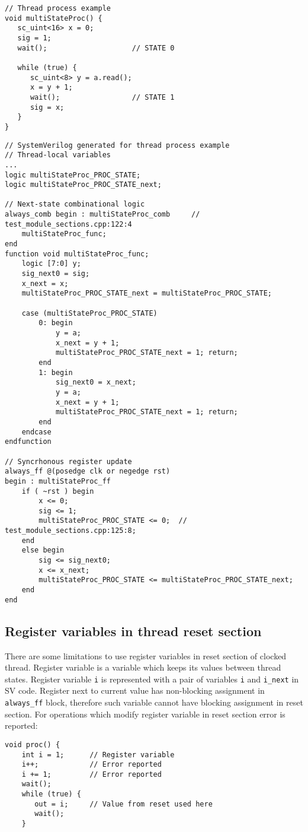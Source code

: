 \begin{lstlisting}[style=mycpp]
// Thread process example
void multiStateProc() {
   sc_uint<16> x = 0;
   sig = 1;              
   wait();                    // STATE 0

   while (true) {
      sc_uint<8> y = a.read(); 
      x = y + 1;
      wait();                 // STATE 1
      sig = x;           
   }
}
\end{lstlisting}

\begin{lstlisting}[style=myverilog]
// SystemVerilog generated for thread process example
// Thread-local variables
...
logic multiStateProc_PROC_STATE;
logic multiStateProc_PROC_STATE_next;

// Next-state combinational logic
always_comb begin : multiStateProc_comb     // test_module_sections.cpp:122:4
    multiStateProc_func;
end
function void multiStateProc_func;
    logic [7:0] y;
    sig_next0 = sig;
    x_next = x;
    multiStateProc_PROC_STATE_next = multiStateProc_PROC_STATE;
    
    case (multiStateProc_PROC_STATE)
        0: begin
            y = a;
            x_next = y + 1;
            multiStateProc_PROC_STATE_next = 1; return;  
        end
        1: begin
            sig_next0 = x_next;
            y = a;
            x_next = y + 1;
            multiStateProc_PROC_STATE_next = 1; return; 
        end
    endcase
endfunction

// Syncrhonous register update
always_ff @(posedge clk or negedge rst) 
begin : multiStateProc_ff
    if ( ~rst ) begin
        x <= 0;
        sig <= 1;
        multiStateProc_PROC_STATE <= 0;  // test_module_sections.cpp:125:8;
    end
    else begin
        sig <= sig_next0;
        x <= x_next;
        multiStateProc_PROC_STATE <= multiStateProc_PROC_STATE_next;
    end
end
\end{lstlisting}

\subsection{Register variables in thread reset section}\label{section:reg_in_reset}

There are some limitations to use register variables in reset section of clocked thread. Register variable is a variable which keeps its values between thread states. Register variable {\tt i} is represented with a pair of variables {\tt i} and {\tt i\_next} in SV code. Register next to current value has non-blocking assignment in {\tt always\_ff} block, therefore such variable cannot have blocking assignment in reset section. For operations which modify register variable in reset section error is reported:
%
\begin{lstlisting}[style=mycpp]
void proc() {
    int i = 1;      // Register variable
    i++;            // Error reported
    i += 1;         // Error reported
    wait();
    while (true) {
       out = i;     // Value from reset used here
       wait();
    }        
\end{lstlisting}


